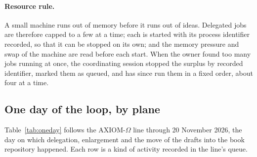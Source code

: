 \documentclass[11pt]{article}
\begin{document}
\paragraph{Resource rule.} A small machine runs out of memory before it runs
out of ideas. Delegated jobs are therefore capped to a few at a time; each is
started with its process identifier recorded, so that it can be stopped on
its own; and the memory pressure and swap of the machine are read before each
start. When the owner found too many jobs running at once, the coordinating
session stopped the surplus by recorded identifier, marked them as queued,
and has since run them in a fixed order, about four at a time.

\subsection{One day of the loop, by plane}
\label{sec:oneday}
Table~\ref{tab:oneday} follows the AXIOM-$\Omega$ line through 20 November
2026, the day on which delegation, enlargement and the move of the drafts
into the book repository happened. Each row is a kind of activity recorded
in the line's queue.
\end{document}
